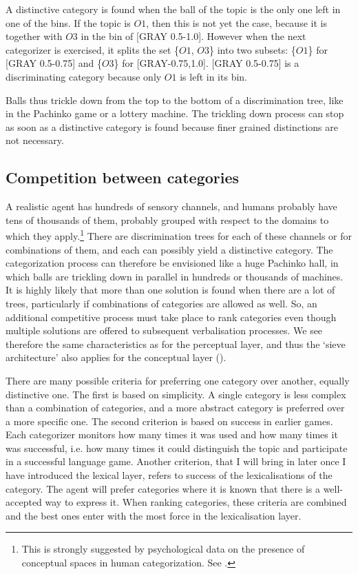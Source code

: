A distinctive category is found when the ball of the 
topic is the only one left in one of the bins. 
If the topic is $O1$, then this is not yet the 
case, because it is together with $O3$ in the 
bin of [GRAY 0.5-1.0]. However when the next categorizer
is exercised, it splits the set \{$O1$, $O3$\} 
into two subsets: \{$O1$\} for [GRAY 0.5-0.75]
and \{$O3$\} for [GRAY-0.75,1.0]. 
[GRAY 0.5-0.75] is a discriminating category because only 
$O1$ is left in its bin. 

Balls thus trickle down from the top to the bottom of 
a discrimination tree, like in the Pachinko game or 
a lottery machine. The trickling down process can stop as
soon as a distinctive category is found because finer grained 
distinctions are not necessary. 

\subsection{Competition between categories}

A realistic agent has hundreds of sensory
channels, and humans probably have tens of thousands
of them, probably grouped with respect to the domains
to which they apply.\footnote{
This is strongly suggested by psychological 
data on the presence of conceptual spaces in human 
categorization. See \cite{Gardenfors:1999}.} There are discrimination trees
for each of 
these channels or for combinations of them, and 
each can possibly yield a distinctive
category. The categorization process can therefore be
envisioned like a huge Pachinko hall, in which
balls are trickling down in parallel in hundreds or 
thousands of machines. It is highly 
likely that more than one solution is found
when there are a lot of trees, particularly 
if combinations of categories are allowed as well. 
So, an additional competitive process must 
take place to rank categories even 
though multiple solutions are offered to subsequent
verbalisation processes. We see therefore the same
characteristics as for the perceptual layer, and thus
the `sieve architecture' also 
applies for the conceptual layer (). 
 
There are many possible criteria for preferring 
one category over another, equally distinctive one. 
The first is based on 
simplicity. A single category is less complex than 
a combination of categories, and a more abstract category 
is preferred over a more specific one. 
The second criterion is based on success in earlier games. 
Each categorizer monitors how many
times it was used and how many times
it was successful, i.e. how many times it could distinguish
the topic and participate in a successful language game. 
Another criterion, that I will bring in later 
once I have introduced the lexical layer, refers to 
success of the lexicalisations of the category. The agent 
will prefer categories where it is known that there is
a well-accepted way to express it. 
When ranking categories, these criteria are combined
and the best ones enter with the most force in the 
lexicalisation layer. 

